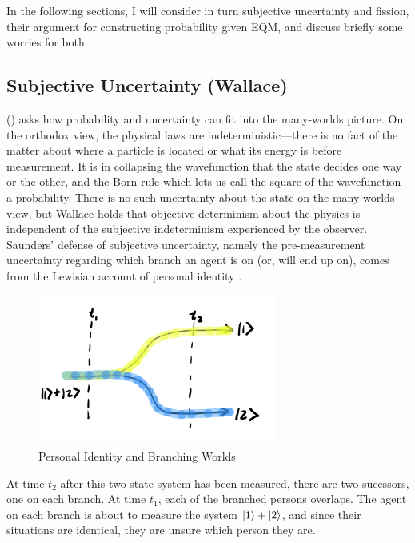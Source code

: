 \documentclass{article}
\begin{document}
In the following sections, I will consider in turn subjective uncertainty and fission, their argument for constructing probability given EQM, and discuss briefly some worries for both.


\subsection{Subjective Uncertainty (Wallace)}
\citeauthor{wallaceEpistemologyQuantizedCircumstances2006} (\citeyear{wallaceEpistemologyQuantizedCircumstances2006}) asks how probability and uncertainty can fit into the many-worlds picture.
On the orthodox view, the physical laws are indeterministic—there is no fact of the matter about where a particle is located or what its energy is before measurement. It is in collapsing the wavefunction that the state decides one way or the other, and the Born-rule which lets us call the square of the wavefunction a probability.
There is no such uncertainty about the state on the many-worlds view, but Wallace holds that objective determinism about the physics is independent of the subjective indeterminism experienced by the observer. Saunders' defense of subjective uncertainty, namely the pre-measurement uncertainty regarding which branch an agent is on (or, will end up on), comes from the Lewisian account of personal identity \parencite[295]{saundersBranchingUncertainty2008} .
\begin{figure}[h]
	\centering
	\includegraphics[width=0.7\textwidth]{lewis.png}
	\caption{Personal Identity and Branching Worlds}
	\label{f:lewis}
\end{figure}
At time $t_2$ after this two-state system has been measured, there are two sucessors, one on each branch. At time $t_1$, each of the branched persons overlaps. The agent on each branch is about to measure the system $\ket{1} + \ket{2}$, and since their situations are identical, they are unsure which person they are. 
\end{document}
